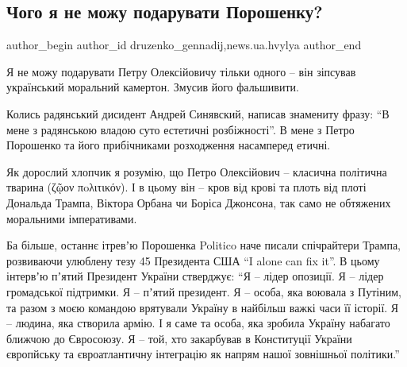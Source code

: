  
 
 
 
 
\subsection{Чого я не можу подарувати Порошенку?}
\label{sec:16_01_2022.stz.news.ua.hvylya.2.poroshenko_kamerton}

\ifcmt
 author_begin
   author_id druzenko_gennadij,news.ua.hvylya
 author_end
\fi

\begin{zznagolos}
Я не можу подарувати Петру Олексійовичу тільки одного – він зіпсував
український моральний камертон. Змусив його фальшивити.
\end{zznagolos}

Колись радянський дисидент Андрей Синявский, написав знамениту фразу: \enquote{В мене з
радянською владою суто естетичні розбіжності}. В мене з Петро Порошенко та його
прибічниками розходження насамперед етичні.

Як дорослий хлопчик я розумію, що Петро Олексійович – класична політична
тварина (ζῷον πoλιτικόν). І в цьому він – кров від крові та плоть від плоті
Дональда Трампа, Віктора Орбана чи Боріса Джонсона, так само не обтяжених
моральними імперативами.


Ба більше, останнє ітревʼю Порошенка Politico наче писали спічрайтери Трампа,
розвиваючи улюблену тезу 45 Президента США \enquote{I alone can fix it}. В цьому
інтервʼю пʼятий Президент України стверджує: \enquote{Я – лідер опозиції. Я – лідер
громадської підтримки. Я – пʼятий президент. Я – особа, яка воювала з Путіним,
та разом з моєю командою врятували Україну в найбільш важкі часи її історії. Я
– людина, яка створила армію. І я саме та особа, яка зробила Україну набагато
ближчою до Євросоюзу. Я – той, хто закарбував в Конституції України європйську
та євроатлантичну інтеграцію як напрям нашої зовнішньої політики.}

